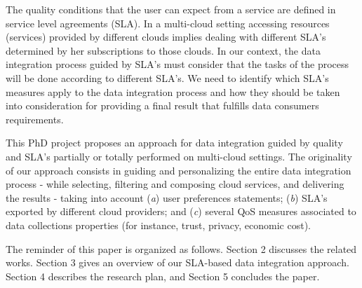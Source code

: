 The quality conditions that the user can expect from a service are defined in
 service level agreements (SLA). In a multi-cloud setting accessing resources (services) provided by different clouds implies dealing with different SLA's determined by her subscriptions to those clouds. In our context, the data integration process guided by SLA's must consider that the tasks of the process will be done according to different SLA's. We need to identify which SLA's measures apply to the data integration process and how they should be taken into consideration for providing a final result that fulfills data consumers requirements.
%
%
%

This PhD project proposes 
an approach for data integration guided by quality and SLA's partially or totally performed on multi-cloud settings.  The originality of our approach consists in guiding and personalizing
the entire data integration process - while selecting, filtering and composing
cloud services, and delivering the results - taking into account (\textit{a})
user preferences statements; (\textit{b}) SLA's exported by different
cloud providers; and (\textit{c}) several QoS measures associated to data
collections properties (for instance, trust, privacy, economic cost).    

The reminder of this paper is organized as follows.
Section 2 discusses the related works.
Section 3 gives an overview of our SLA-based data integration approach.
Section 4 describes the research plan, and  Section 5 concludes the paper.
